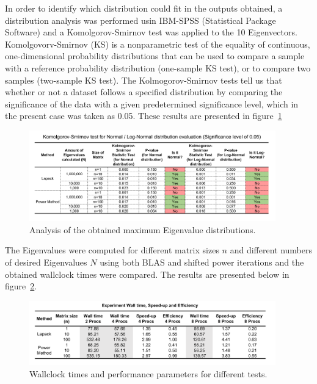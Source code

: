 \documentclass[11pt, oneside]{article}
\begin{document}
        In order to identify which distribution could fit in the outputs obtained, a distribution analysis was performed usin IBM-SPSS (Statistical Package Software) and a Komolgorov-Smirnov test was applied to the 10 Eigenvectors. Komolgovorv-Smirnov (KS) is a nonparametric test of the equality of continuous, one-dimensional probability distributions that can be used to compare a sample with a reference probability distribution (one-sample KS test), or to compare two samples (two-sample KS test). The Kolmogorov-Smirnov tests tell us that whether or not a dataset follows a specified distribution by comparing the significance of the data with a given predetermined significance level, which in the present case was taken as 0.05. These results are presented in figure~\ref{fig:3}
        \begin{figure}[h]
		\centering
		\includegraphics[width=0.95\textwidth]{Figures/tab_test.png}
		\caption{Analysis of the obtained maximum Eigenvalue distributions.}
		\label{fig:3}
	\end{figure}
        

The Eigenvalues were computed for different matrix sizes $n$ and different numbers of desired Eigenvalues $N$ using both BLAS and shifted power iterations and the obtained wallclock times were compared. The results are presented below in  figure~\ref{fig:walltime}.
        	\begin{figure}[h]
		\centering
		\includegraphics[width=0.95\textwidth]{Figures/eff.png}
		\caption{Wallclock times and performance parameters for different tests.}
		\label{fig:walltime}
	        \end{figure}
\end{document}
